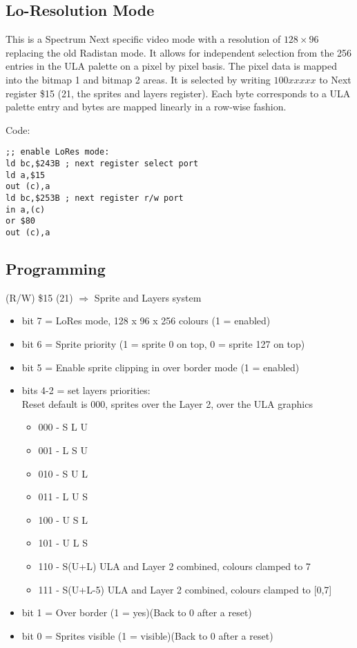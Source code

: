 \subsection{Lo-Resolution Mode}

This is a Spectrum Next specific video mode with a resolution of
$128\times96$ replacing the old Radistan mode.  It allows for
independent selection from the 256 entries in the ULA palette on a
pixel by pixel basis. The pixel data is mapped into the bitmap 1 and
bitmap 2 areas.  It is selected by writing $100xxxxx$ to Next register
\$15 (21, the sprites and layers register).  Each byte corresponds to
a ULA palette entry and bytes are mapped linearly in a row-wise
fashion.

Code:
\begin{verbatim}
;; enable LoRes mode:
ld bc,$243B ; next register select port
ld a,$15
out (c),a
ld bc,$253B ; next register r/w port
in a,(c)
or $80
out (c),a
\end{verbatim}

\subsection{Programming}

(R/W) \$15 (21) $\Rightarrow$ Sprite and Layers system
\begin{itemize}
\item[] bit 7 = LoRes mode, 128 x 96 x 256 colours (1 = enabled)
\item[] bit 6 = Sprite priority (1 = sprite 0 on top, 0 = sprite 127 on top)
\item[] bit 5 = Enable sprite clipping in over border mode (1 = enabled)
\item[] bits 4-2 = set layers priorities:\\
  Reset default is 000, sprites over the Layer 2, over the ULA graphics
  \begin{itemize}
  \item[] 000 - S L U
  \item[] 001 - L S U
  \item[] 010 - S U L
  \item[] 011 - L U S
  \item[] 100 - U S L
  \item[] 101 - U L S
  \item[] 110 - S(U+L) ULA and Layer 2 combined, colours clamped to 7
  \item[] 111 - S(U+L-5) ULA and Layer 2 combined, colours clamped to [0,7]
  \end{itemize}
\item[] bit 1 = Over border (1 = yes)(Back to 0 after a reset)
\item[] bit 0 = Sprites visible (1 = visible)(Back to 0 after a reset)
\end{itemize}

